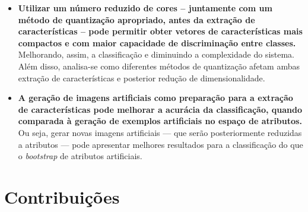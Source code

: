\begin{itemize}

  \item \textbf{Utilizar um número reduzido de cores -- juntamente com um método de quantização apropriado, antes da extração de características -- pode permitir obter vetores de características mais compactos e com maior capacidade de discriminação entre classes.} Melhorando, assim, a classificação e diminuindo a complexidade do sistema. Além disso, analisa-se como diferentes métodos de quantização afetam ambas extração de características e posterior redução de dimensionalidade.

  \item \textbf{A geração de imagens artificiais como preparação para a extração de características pode melhorar a acurácia da classificação, quando comparada à geração de exemplos artificiais no espaço de atributos.} Ou seja, gerar novas imagens artificiais — que serão posteriormente reduzidas a atributos — pode apresentar melhores resultados para a classificação do que o \textit{bootstrap} de atributos artificiais.

\end{itemize}

\section{Contribuições}

